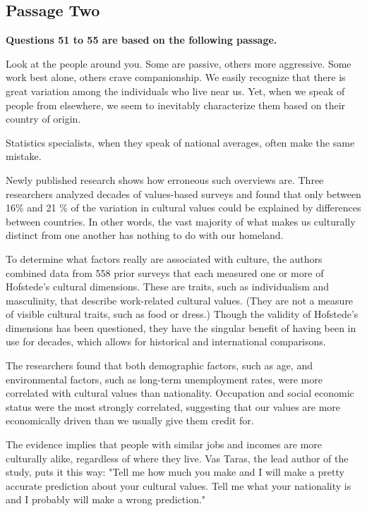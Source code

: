 \documentclass[UTF8,11pt]{ctexart}
\begin{document}
\subsection*{\textbf{Passage Two}}


\textbf{Questions 51 to 55 are based on the following passage.}


Look at the people around you. Some are passive, others more aggressive. Some work best alone, others crave companionship. We easily recognize that there is great variation among the individuals who live near us. Yet, when we speak of people from elsewhere, we seem to inevitably characterize them based on their country of origin.


Statistics specialists, when they speak of national averages, often make the same mistake.


Newly published research shows how erroneous such overviews are. Three researchers analyzed decades of values-based surveys and found that only between 16\% and 21 \% of the variation in cultural values could be explained by differences between countries. In other words, the vast majority of what makes us culturally distinct from one another has nothing to do with our homeland.


To determine what factors really are associated with culture, the authors combined data from 558 prior surveys that each measured one or more of Hofstede's cultural dimensions. These are traits, such as individualism and masculinity, that describe work-related cultural values. (They are not a measure of visible cultural traits, such as food or dress.) Though the validity of Hofstede's dimensions has been questioned, they have the singular benefit of having been in use for decades, which allows for historical and international comparisons.


The researchers found that both demographic factors, such as age, and environmental factors, such as long-term unemployment rates, were more correlated with cultural values than nationality. Occupation and social economic status were the most strongly correlated, suggesting that our values are more economically driven than we usually give them credit for.


The evidence implies that people with similar jobs and incomes are more culturally alike, regardless of where they live. Vas Taras, the lead author of the study, puts it this way: "Tell me how much you make and I will make a pretty accurate prediction about your cultural values. Tell me what your nationality is and I probably will make a wrong prediction."
\end{document}
